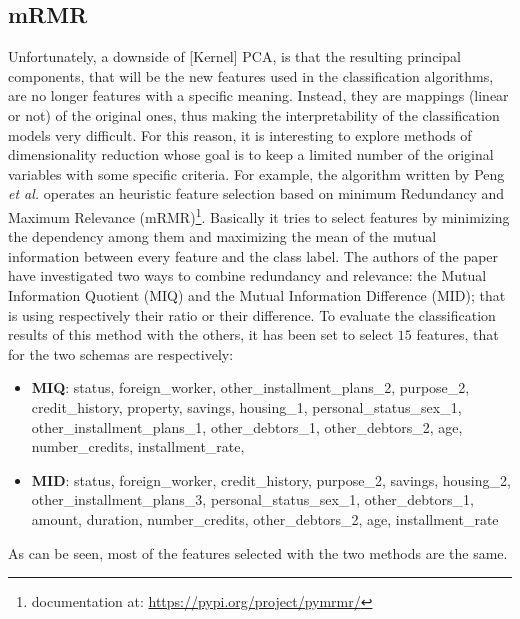 \documentclass[letterpaper]{article}
\begin{document}
	\subsection{mRMR}
	\par Unfortunately, a downside of [Kernel] PCA, is that the resulting principal components, that will be the new features used in the classification algorithms, are no longer features with a specific meaning. Instead, they are mappings (linear or not) of the original ones, thus making the interpretability of the classification models very difficult. For this reason, it is interesting to explore methods of dimensionality reduction whose goal is to keep a limited number of the original variables with some specific criteria. For example, the algorithm written by Peng \emph{et al.}\cite{Peng05featureselection} operates an heuristic feature selection based on minimum Redundancy and Maximum Relevance (mRMR)\footnote{documentation at: \url{https://pypi.org/project/pymrmr/}}. Basically it tries to select features by minimizing the dependency among them and maximizing the mean of the mutual information between every feature and the class label. The authors of the paper have investigated two ways to combine redundancy and relevance: the Mutual Information Quotient (MIQ) and the Mutual Information Difference (MID); that is using respectively their ratio or their difference. To evaluate the classification results of this method with the others, it has been set to select $15$ features, that for the two schemas are respectively:
	\begin{itemize}
		\item \textbf{MIQ}: status, foreign\_worker, other\_installment\_plans\_2, purpose\_2, credit\_history, property, savings, housing\_1, personal\_status\_sex\_1, other\_installment\_plans\_1, other\_debtors\_1, other\_debtors\_2, age, number\_credits, installment\_rate,
		\item \textbf{MID}: status, foreign\_worker, credit\_history, purpose\_2, savings, housing\_2, other\_installment\_plans\_3, personal\_status\_sex\_1, other\_debtors\_1, amount, duration, number\_credits, other\_debtors\_2, age, installment\_rate
	\end{itemize}
	As can be seen, most of the features selected with the two methods are the same.
\end{document}
